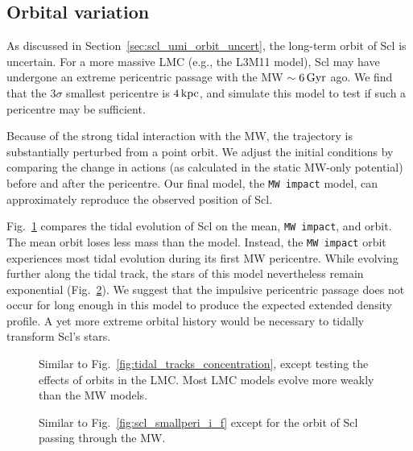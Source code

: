 \subsection{Orbital variation}\label{orbital-variation}

As discussed in Section~\ref{sec:scl_umi_orbit_uncert}, the long-term
orbit of Scl is uncertain. For a more massive LMC (e.g., the L3M11
model), Scl may have undergone an extreme pericentric passage with the
MW \(\sim 6\,{\rm Gyr}\) ago. We find that the 3\(\sigma\) smallest
pericentre is \(4\,{\rm kpc}\), and simulate this model to test if such a
pericentre may be sufficient.

Because of the strong tidal interaction with the MW, the trajectory is
substantially perturbed from a point orbit. We adjust the initial
conditions by comparing the change in actions (as calculated in the
static MW-only potential) before and after the pericentre. Our final
model, the \texttt{MW\ impact} model, can approximately reproduce the
observed position of Scl.

Fig.~\ref{fig:tidal_tracks_umi} compares the tidal evolution of Scl on
the mean, \texttt{MW\ impact}, and \smallperi{} orbit. The mean orbit
loses less mass than the \smallperi{} model. Instead, the
\texttt{MW\ impact} orbit experiences most tidal evolution during its
first MW pericentre. While evolving further along the tidal track, the
stars of this model nevertheless remain exponential
(Fig.~\ref{fig:scl_mw_impact_i_f}). We suggest that the impulsive
pericentric passage does not occur for long enough in this model to
produce the expected extended density profile. A yet more extreme
orbital history would be necessary to tidally transform Scl's stars.

\begin{figure}
\centering
{}
\caption[Sculptor's tidal evolution for different orbits]{Similar to
Fig.~\ref{fig:tidal_tracks_concentration}, except testing the effects of
orbits in the LMC. Most LMC models evolve more weakly than the MW
models.}\label{fig:tidal_tracks_umi}
\end{figure}

\begin{figure}
\centering
{}
\caption[Sculptor MW-impact density profiles]{Similar to
Fig.~\ref{fig:scl_smallperi_i_f} except for the orbit of Scl passing
through the MW.}\label{fig:scl_mw_impact_i_f}
\end{figure}

